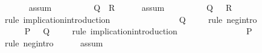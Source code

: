 \begin{isabellebody}
\ \ \ \ \isamarkupfalse%
\ assum{}\isanewline
\ \ \ \ \isacommand{{\isachardot}{\kern0pt}}\isamarkupfalse%
\isanewline
\ \ \isamarkupfalse%
\ {}{\isacharcolon}{\kern0pt}\ {\isachardoublequoteopen}Q\ {\isasymlongrightarrow}\ R{\isachardoublequoteclose}\isanewline
\ \ \ \ \isamarkupfalse%
\ assum{}\isanewline
\ \ \ \ \isacommand{{\isachardot}{\kern0pt}}\isamarkupfalse%
\isanewline
\ \ \isamarkupfalse%
\ {}{\isacharcolon}{\kern0pt}\ {\isachardoublequoteopen}Q\ {\isasymlongrightarrow}\ {\isasymnot}\ R{\isachardoublequoteclose}\isanewline
\ \ \ \ \isamarkupfalse%
{\isacharparenleft}{\kern0pt}rule\ implication{\isacharunderscore}{\kern0pt}introduction{\isacharparenright}{\kern0pt}\isanewline
\ \ \ \ \isamarkupfalse%
\ {}\isanewline
\ \ \ \ \isacommand{{\isachardot}{\kern0pt}}\isamarkupfalse%
\isanewline
\ \ \isamarkupfalse%
\ {}{\isacharcolon}{\kern0pt}\ {\isachardoublequoteopen}{\isasymnot}Q{\isachardoublequoteclose}\isanewline
\ \ \ \ \isamarkupfalse%
{\isacharparenleft}{\kern0pt}rule\ neg{\isacharunderscore}{\kern0pt}intro{\isacharparenright}{\kern0pt}\isanewline
\ \ \ \ \isamarkupfalse%
\ {}\ {}\isanewline
\ \ \ \ \isacommand{{\isachardot}{\kern0pt}}\isamarkupfalse%
\isanewline
\isanewline
\ \ \isamarkupfalse%
\ {}{\isacharcolon}{\kern0pt}\ {\isachardoublequoteopen}P\ {\isasymlongrightarrow}\ {\isasymnot}\ Q{\isachardoublequoteclose}\isanewline
\ \ \ \ \isamarkupfalse%
{\isacharparenleft}{\kern0pt}rule\ implication{\isacharunderscore}{\kern0pt}introduction{\isacharparenright}{\kern0pt}\isanewline
\ \ \ \ \isamarkupfalse%
\ {}\isanewline
\ \ \ \ \isacommand{{\isachardot}{\kern0pt}}\isamarkupfalse%
\isanewline
\isanewline
\ \ \isamarkupfalse%
\ {\isachardoublequoteopen}{\isasymnot}\ P{\isachardoublequoteclose}\isanewline
\ \ \ \ \isamarkupfalse%
{\isacharparenleft}{\kern0pt}rule\ neg{\isacharunderscore}{\kern0pt}intro{\isacharparenright}{\kern0pt}\isanewline
\ \ \ \ \isamarkupfalse%
\ assum{}\ {}\isanewline
\ \ \ \ \isacommand{{\isachardot}{\kern0pt}}\isamarkupfalse%
\isanewline
\isanewline
{}\isamarkupfalse%
%
\endisatagproof
{\isafoldproof}%
%
\isadelimproof
\isanewline
%
\endisadelimproof
\isanewline
%
\isadelimtheory
\isanewline
%
\endisadelimtheory
%
\isatagtheory
{}\isamarkupfalse%
%
\endisatagtheory
{\isafoldtheory}%
%
\isadelimtheory
%
\endisadelimtheory
%
\end{isabellebody}%
